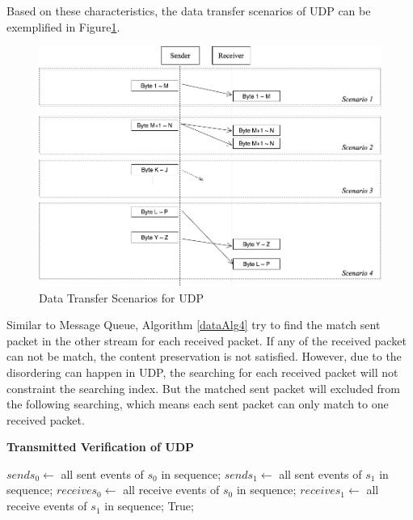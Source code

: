 Based on these characteristics, the data transfer scenarios of UDP can be exemplified in Figure\ref{upd}.
\begin{figure}[H]
\centerline{\includegraphics[scale=0.4]{Figures/udp}}
 \caption{Data Transfer Scenarios for UDP}
\label{upd}
\end{figure}

Similar to Message Queue, Algorithm \ref{dataAlg4} try to find the match sent packet in the other stream for each received packet. If any of the received packet can not be match, the content preservation is not satisfied. However, due to the disordering can happen in UDP, the searching for each received packet will not constraint the searching index. But the matched sent packet will excluded from the following searching, which means each sent packet can only match to one received packet.

\begin{algorithm}[H]
\DontPrintSemicolon
\caption{{\bf Transmitted Verification of UDP} \label{dataAlg4}}
\;
$sends_0 \leftarrow$ all sent events of $s_0$ in sequence;\;
$sends_1 \leftarrow$ all sent events of $s_1$ in sequence;\;
$receives_0 \leftarrow$ all receive events of $s_0$ in sequence;\;
$receives_1 \leftarrow$ all receive events of $s_1$ in sequence;\;
 \KwRet True;\;
\end{algorithm} 

